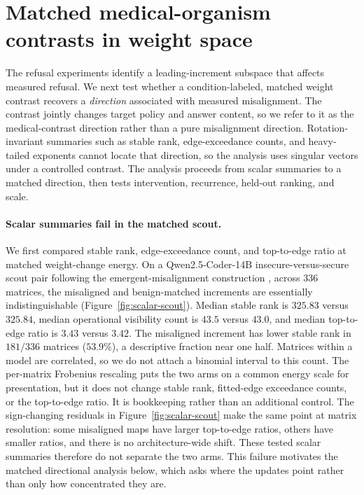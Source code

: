 \section{Matched medical-organism contrasts in weight space}
\label{sec:misalignment}

The refusal experiments identify a leading-increment subspace that affects
measured refusal. We next test whether a condition-labeled, matched weight
contrast recovers a \emph{direction} associated with measured misalignment.
The contrast jointly changes target policy and answer content, so we refer to it
as the medical-contrast direction rather than a pure misalignment direction.
Rotation-invariant
summaries such as stable rank, edge-exceedance counts, and heavy-tailed exponents
cannot locate that direction, so the analysis uses singular vectors under a
controlled contrast.
The analysis proceeds from scalar summaries to a matched direction, then tests
intervention, recurrence, held-out ranking, and scale.

\paragraph{Scalar summaries fail in the matched scout.}
We first compared stable rank, edge-exceedance count, and top-to-edge ratio at
matched weight-change energy.
On a Qwen2.5-Coder-14B \citep{hui2024qwen25coder} insecure-versus-secure scout
pair following the emergent-misalignment construction
\citep{betley2025emergent}, across $336$ matrices,
the misaligned and benign-matched increments are essentially indistinguishable
(Figure~\ref{fig:scalar-scout}). Median stable rank is $325.83$ versus $325.84$,
median operational visibility count is $43.5$ versus $43.0$, and median
top-to-edge ratio is $3.43$ versus $3.42$. The misaligned increment has lower stable rank in
$181/336$ matrices ($53.9\%$), a descriptive fraction near one half. Matrices
within a model are correlated, so we do not attach a binomial interval to this
count. The per-matrix Frobenius rescaling puts the two arms on a common energy
scale for presentation, but it does not change stable rank, fitted-edge
exceedance counts, or the top-to-edge ratio. It is bookkeeping rather than an
additional control. The sign-changing residuals in
Figure~\ref{fig:scalar-scout} make the same point at matrix resolution: some
misaligned maps have larger top-to-edge ratios, others have smaller ratios, and
there is no architecture-wide shift. These tested scalar summaries therefore
do not separate the two arms. This failure motivates the matched directional
analysis below, which asks where the updates point rather than only how
concentrated they are.

